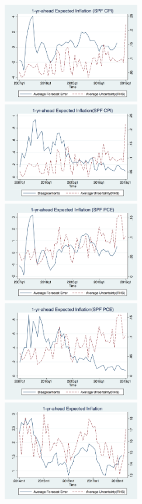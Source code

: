 \documentclass[]{article}
\begin{document}
\begin{figure}[h]\label{UnceratitnyOtherMoments}
	\centering
	\includegraphics[width=6cm]{figures/fe_var2Q.png}
	\includegraphics[width=6cm]{figures/var_disg2Q.png}\\
	\smallskip
	\includegraphics[width=6cm]{figures/fe_var3Q.png}
	\includegraphics[width=6cm]{figures/var_disg3Q.png}\\
	\smallskip	
	\includegraphics[width=6cm]{figures/fe_var.png}

\end{figure}
\end{document}
